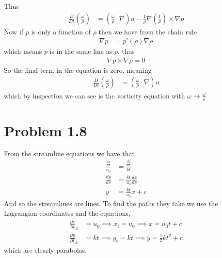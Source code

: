 \documentclass[12pt]{article}
\newcommand{\eq}[1]{\begin{align*}#1\end{align*}}
\newcommand{\p}[2]{\frac{\partial#1}{\partial#2}}
\begin{document}
Thus
\eq{
	\frac{D}{Dt}(\frac{\omega}{\rho}) &= (\frac{\omega}{\rho}\cdot\nabla)u -\frac{1}{\rho}\nabla(\frac{1}{\rho})\times\nabla p
}
Now if $p$ is only a function of $\rho$ then we have from the chain rule
\eq{
	\nabla p &= p'(\rho)\nabla\rho
}
which means $p$ is in the same line as $\rho$, thus
\eq{
	\nabla p \times \nabla \rho = 0
}
So the final term in the equation is zero, meaning
\eq{
	\frac{D}{Dt}(\frac{\omega}{\rho}) &= (\frac{\omega}{\rho}\cdot\nabla)u
}
which by inspection we can see is the vorticity equation with $\omega \rightarrow \frac{\omega}{\rho}$
\section*{Problem 1.8}
From the streamline equations we have that
\eq{
	\frac{\frac{dx}{dx}}{u_0} &= \frac{\frac{dy}{dx}}{kt}\\
	\frac{dy}{ds} &= \frac{kt}{u_0}\frac{dx}{ds}\\
	y &= \frac{kt}{u_0}x + c
}
And so the streamlines are lines. To find the paths they take we use the Lagrangian coordinates and the equations,
\eq{
	\p{x}{t}_x &= u_0 \implies x_t = u_0 \implies x = u_0 t + c\\
	\p{y}{t}_x &= kt \implies y_t = kt \implies y = \frac{1}{2}kt^2 + c
}
which are clearly parabolas.
\end{document}
